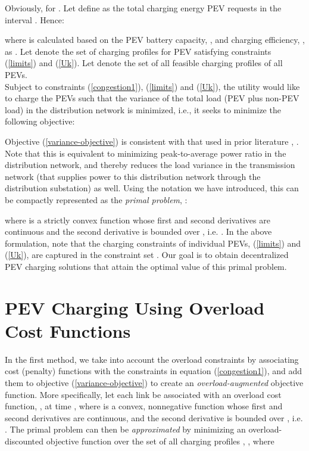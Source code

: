 \documentclass[12pt,draftcls,onecolumn]{IEEEtran}
\begin{document}
Obviously,  for . Let define  as the total charging energy PEV  requests in the interval . Hence:

where  is calculated based on the PEV battery capacity, , and charging efficiency, , as . Let  denote the set of charging profiles for PEV  satisfying constraints (\ref{limits}) and (\ref{Uk}). Let  denote the set of all feasible charging profiles of all PEVs.\\
\indent Subject to constraints (\ref{congestion1}), (\ref{limits}) and (\ref{Uk}), the utility would like to charge the PEVs such that the variance of the total load (PEV plus non-PEV load) in the distribution network is minimized, i.e., it seeks to minimize the following objective:

Objective (\ref{variance-objective}) is consistent with that used in prior literature \cite{MCH10}, \cite{GTL13}. Note that this is equivalent to minimizing peak-to-average power ratio in the distribution network, and thereby reduces the load variance in the transmission network (that supplies power to this distribution network through the distribution substation) as well.
Using the notation we have introduced, this can be compactly represented as the \emph{primal problem}, :

where  is a strictly convex function whose first and second derivatives are continuous and the second derivative is bounded over , i.e.  .
In the above formulation, note that the charging constraints of individual PEVs, (\ref{limits}) and (\ref{Uk}), are captured in the constraint set . Our goal is to obtain decentralized PEV charging solutions that attain the optimal value  of this primal problem.
\section{PEV Charging Using Overload Cost Functions} \label{sec:overload-cost}
\indent In the first method, we take into account the overload constraints by associating cost (penalty) functions with the constraints in equation (\ref{congestion1}), and add them to objective (\ref{variance-objective}) to create an \emph{overload-augmented} objective function. More specifically, let each link  be associated with an overload cost function, , at time , where  is a convex, nonnegative function whose first and second derivatives are continuous, and the second derivative is bounded over , i.e.  . The primal problem can then be \emph{approximated} by minimizing an overload-discounted objective function  over the set of all charging profiles , , where
\end{document}
